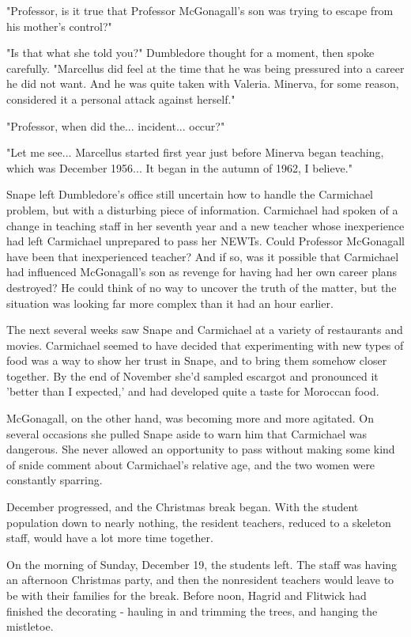 \documentclass[a4paper,11pt]{article}
\begin{document}
"Professor, is it true that Professor McGonagall's son was trying to escape from his mother's control?"

"Is that what she told you?" Dumbledore thought for a moment, then spoke carefully. "Marcellus did feel at the time that he was being pressured into a career he did not want. And he was quite taken with Valeria. Minerva, for some reason, considered it a personal attack against herself."

"Professor, when did the... incident... occur?"

"Let me see... Marcellus started first year just before Minerva began teaching, which was December 1956... It began in the autumn of 1962, I believe."

Snape left Dumbledore's office still uncertain how to handle the Carmichael problem, but with a disturbing piece of information. Carmichael had spoken of a change in teaching staff in her seventh year and a new teacher whose inexperience had left Carmichael unprepared to pass her NEWTs. Could Professor McGonagall have been that inexperienced teacher? And if so, was it possible that Carmichael had influenced McGonagall's son as revenge for having had her own career plans destroyed? He could think of no way to uncover the truth of the matter, but the situation was looking far more complex than it had an hour earlier.

The next several weeks saw Snape and Carmichael at a variety of restaurants and movies. Carmichael seemed to have decided that experimenting with new types of food was a way to show her trust in Snape, and to bring them somehow closer together. By the end of November she'd sampled escargot and pronounced it 'better than I expected,' and had developed quite a taste for Moroccan food.

McGonagall, on the other hand, was becoming more and more agitated. On several occasions she pulled Snape aside to warn him that Carmichael was dangerous. She never allowed an opportunity to pass without making some kind of snide comment about Carmichael's relative age, and the two women were constantly sparring.

December progressed, and the Christmas break began. With the student population down to nearly nothing, the resident teachers, reduced to a skeleton staff, would have a lot more time together.

On the morning of Sunday, December 19, the students left. The staff was having an afternoon Christmas party, and then the nonresident teachers would leave to be with their families for the break. Before noon, Hagrid and Flitwick had finished the decorating - hauling in and trimming the trees, and hanging the mistletoe.
\end{document}
